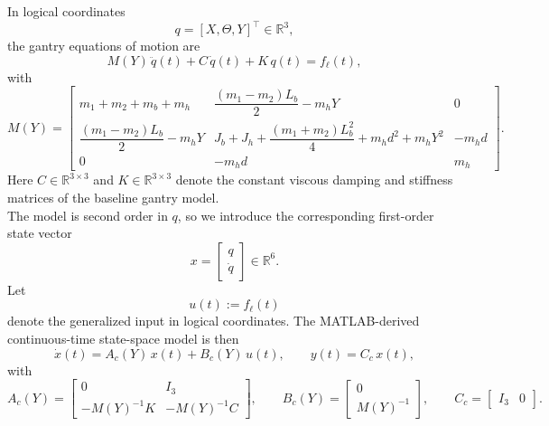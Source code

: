 \documentclass[11pt]{article}
\newcommand{\R}{\mathbb{R}}
\begin{document}
In logical coordinates
\[
q = [X,\Theta,Y]^\top \in \R^3,
\]
the gantry equations of motion are
\begin{equation}
    M(Y)\,\ddot{q}(t) + C\,\dot{q}(t) + K\,q(t) = f_\ell(t),
    \label{eqs:eom}
\end{equation}
with
\begin{equation}
    M(Y) =
    \begin{bmatrix}
        m_1 + m_2 + m_b + m_h &
        \dfrac{(m_1-m_2)L_b}{2} - m_h Y &
        0 \\
        \dfrac{(m_1-m_2)L_b}{2} - m_h Y &
        J_b + J_h + \dfrac{(m_1+m_2)L_b^2}{4} + m_h d^2 + m_h Y^2 &
        -m_h d \\
        0 & -m_h d & m_h
    \end{bmatrix}.
    \label{eqs:mass}
\end{equation}
Here $C \in \R^{3\times3}$ and $K \in \R^{3\times3}$ denote the constant
viscous damping and stiffness matrices of the baseline gantry model.
\\
The model is second order in $q$, so we introduce the corresponding first-order
state vector
\begin{equation}
    x = \begin{bmatrix} q \\ \dot{q} \end{bmatrix} \in \R^6.
    \label{eqs:state}
\end{equation}
Let
\begin{equation}
    u(t) := f_\ell(t)
    \label{eqs:input}
\end{equation}
denote the generalized input in logical coordinates. The MATLAB-derived
continuous-time state-space model is then
\begin{equation}
    \dot{x}(t) = A_c(Y)\,x(t) + B_c(Y)\,u(t),
    \qquad
    y(t) = C_c\,x(t),
    \label{eqs:ctss}
\end{equation}
with
\begin{equation}
    A_c(Y) =
    \begin{bmatrix}
        0 & I_3 \\
        -M(Y)^{-1}K & -M(Y)^{-1}C
    \end{bmatrix},
    \qquad
    B_c(Y) =
    \begin{bmatrix}
        0 \\
        M(Y)^{-1}
    \end{bmatrix},
    \qquad
    C_c = \begin{bmatrix} I_3 & 0 \end{bmatrix}.
    \label{eqs:ctmats}
\end{equation}
\end{document}
